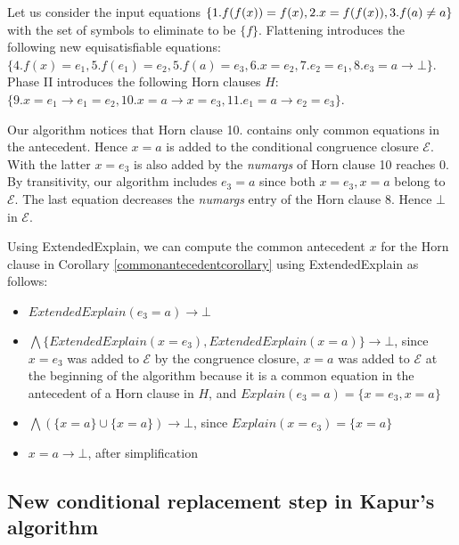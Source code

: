 \begin{example}
  Let us consider the input equations $\{
    1. f(f(x)) = f(x), \\ 2. x = f(f(x)), 
  3. f(a) \neq a\}$ 
  with the 
  set of symbols to eliminate to be 
  $\{ f \}$.
  Flattening introduces the following
  new equisatisfiable equations:
  $\{4. f(x) = e_1, 5. f(e_1) = e_2, 
    5. f(a) = e_3, 6. x = e_2, 7. e_2 = e_1, 
  8. e_3 = a \rightarrow \bot \}$. 
  Phase II introduces the following 
  Horn clauses $H$:
  $\{9. x = e_1 \rightarrow e_1 = e_2,
    10. x = a \rightarrow x = e_3,
    11. e_1 = a \rightarrow e_2 = e_3
  \}$.

  Our algorithm notices that Horn clause 10.
  contains only common equations in the
  antecedent. Hence $x = a$ is added to the
  conditional congruence closure $\mathcal{E}$.
  With the latter $x = e_3$ is also added by
  the \emph{numargs} of Horn clause 10 reaches
  0. By transitivity, our algorithm
  includes $e_3 = a$ since both $x = e_3,
  x = a$ belong to $\mathcal{E}$.
  The last equation decreases the 
  \emph{numargs} entry of the Horn clause
  8. Hence $\bot$ in $\mathcal{E}$.

  Using ExtendedExplain, we can compute the
  common antecedent $x$ 
  for the Horn clause in Corollary
  \ref{commonantecedentcorollary} using 
  ExtendedExplain as follows:

  \begin{itemize}
    \item $ExtendedExplain(e_3 = a) \rightarrow \bot$
    \item $\bigwedge \{ExtendedExplain(x = e_3), ExtendedExplain(x = a)\} \rightarrow \bot$, since
      $x = e_3$ was added to
      $\mathcal{E}$ by the congruence closure, $x = a$ was added to 
      $\mathcal{E}$ at the beginning of the algorithm because it is
      a common equation in the antecedent of a Horn clause in $H$,
      and $Explain(e_3 = a) = \{x = e_3, x = a\}$
    \item $\bigwedge(\{x = a\} \cup \{x = a\}) \rightarrow \bot$, 
      since $Explain(x = e_3) = \{x = a\}$
    \item $x = a \rightarrow \bot$, after simplification
  \end{itemize}

  \end{example}

  \subsection{New conditional replacement
  step in Kapur's algorithm}

